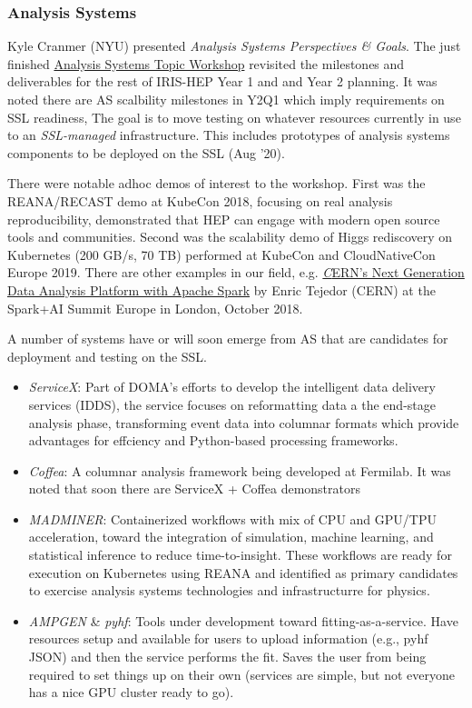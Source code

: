 \documentclass[11pt,letterpaper,fleqn]{article}
\begin{document}
\subsubsection{Analysis Systems}
\vspace{0.2cm}
Kyle Cranmer (NYU) presented {\it Analysis Systems Perspectives \& Goals}.  The just finished \href{https://indico.cern.ch/event/822074/}{Analysis Systems Topic Workshop} revisited the milestones and deliverables for the rest of IRIS-HEP Year 1 and and Year 2 planning.  It was noted there are AS scalbility milestones in Y2Q1 which imply requirements on SSL readiness,  The goal is to move testing on whatever resources currently in use to an {\it SSL-managed} infrastructure.
This includes prototypes of analysis systems components to be deployed on the SSL (Aug '20).

There were notable adhoc demos of interest to the workshop. First was the REANA/RECAST demo at KubeCon 2018, focusing on real analysis reproducibility, demonstrated that HEP can engage with modern open source tools and communities.  Second was the scalability demo of Higgs rediscovery on Kubernetes (200 GB/s, 70 TB) performed at KubeCon and CloudNativeCon Europe 2019.  There are other examples in our field, e.g. \href{https://www.youtube.com/watch?v=Ye8MlJQumaI}{\textit CERN’s Next Generation Data Analysis Platform with Apache Spark} by Enric Tejedor (CERN) at the Spark+AI Summit Europe in London, October 2018.

A number of systems have or will soon emerge from AS that are candidates for deployment and testing on the SSL.

\begin{itemize}
  \item {\it ServiceX}: Part of DOMA's efforts to develop the intelligent data delivery services (IDDS), the service focuses on reformatting data a the end-stage analysis phase, transforming event data into columnar formats which provide advantages for effciency and Python-based processing frameworks.
  \item {\it Coffea}: A columnar analysis framework being developed at Fermilab. It was noted that soon there are ServiceX + Coffea demonstrators
  \item {\it MADMINER}: Containerized workflows with mix of CPU and GPU/TPU acceleration, toward the integration of simulation, machine learning, and statistical inference to reduce time-to-insight. These workflows are ready for execution on Kubernetes using REANA and identified as primary candidates to exercise analysis systems technologies and infrastructurre for physics.
  \item {\it AMPGEN} \& {\it pyhf}: Tools under development toward fitting-as-a-service. Have resources setup and available for users to upload information (e.g., pyhf JSON) and then the service performs the fit. Saves the user from being required to set things up on their own (services are simple, but not everyone has a nice GPU cluster ready to go).
\end{itemize}
\end{document}

